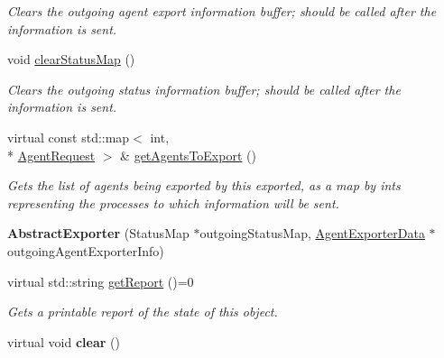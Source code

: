 \begin{DoxyCompactItemize}
\begin{DoxyCompactList}\small\item\em Clears the outgoing agent export information buffer; should be called after the information is sent. \end{DoxyCompactList}\item 
\hypertarget{classrepast_1_1_abstract_exporter_a4a708fff42c4bf1dfb838de5703a6e9a}{void \hyperlink{classrepast_1_1_abstract_exporter_a4a708fff42c4bf1dfb838de5703a6e9a}{clear\-Status\-Map} ()}\label{classrepast_1_1_abstract_exporter_a4a708fff42c4bf1dfb838de5703a6e9a}

\begin{DoxyCompactList}\small\item\em Clears the outgoing status information buffer; should be called after the information is sent. \end{DoxyCompactList}\item 
\hypertarget{classrepast_1_1_abstract_exporter_a019c347c149ee82688ff94323eb67818}{virtual const std\-::map$<$ int, \\*
\hyperlink{classrepast_1_1_agent_request}{Agent\-Request} $>$ \& \hyperlink{classrepast_1_1_abstract_exporter_a019c347c149ee82688ff94323eb67818}{get\-Agents\-To\-Export} ()}\label{classrepast_1_1_abstract_exporter_a019c347c149ee82688ff94323eb67818}

\begin{DoxyCompactList}\small\item\em Gets the list of agents being exported by this exported, as a map by ints representing the processes to which information will be sent. \end{DoxyCompactList}\item 
\hypertarget{classrepast_1_1_abstract_exporter_a02dbd775ca06cc90edc3c8a4834f116a}{{\bfseries Abstract\-Exporter} (Status\-Map $\ast$outgoing\-Status\-Map, \hyperlink{classrepast_1_1_agent_exporter_data}{Agent\-Exporter\-Data} $\ast$outgoing\-Agent\-Exporter\-Info)}\label{classrepast_1_1_abstract_exporter_a02dbd775ca06cc90edc3c8a4834f116a}

\item 
\hypertarget{classrepast_1_1_abstract_exporter_aee45d6557fa45a2690889dbe309d36e6}{virtual std\-::string \hyperlink{classrepast_1_1_abstract_exporter_aee45d6557fa45a2690889dbe309d36e6}{get\-Report} ()=0}\label{classrepast_1_1_abstract_exporter_aee45d6557fa45a2690889dbe309d36e6}

\begin{DoxyCompactList}\small\item\em Gets a printable report of the state of this object. \end{DoxyCompactList}\item 
\hypertarget{classrepast_1_1_abstract_exporter_a5db82162c555e9e223e6083665266163}{virtual void {\bfseries clear} ()}\label{classrepast_1_1_abstract_exporter_a5db82162c555e9e223e6083665266163}


\end{DoxyCompactItemize}
